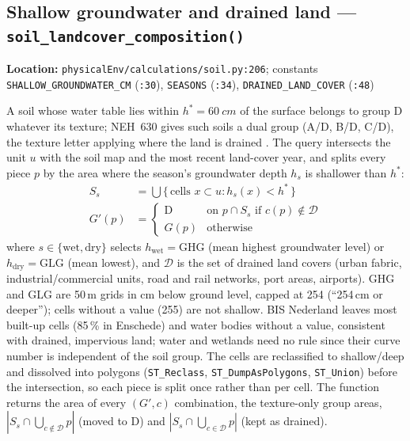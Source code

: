 \documentclass[11pt]{article}
\newcommand{\code}[1]{\texttt{#1}}
\begin{document}
\subsection{Shallow groundwater and drained land --- \code{soil\_landcover\_composition()}}
\label{sec:soil-composition}
\textbf{Location:} \code{physicalEnv/calculations/soil.py:206}; constants \code{SHALLOW\_GROUNDWATER\_CM} (\code{:30}), \code{SEASONS} (\code{:34}), \code{DRAINED\_LAND\_COVER} (\code{:48})

A soil whose water table lies within $h^\ast = \SI{60}{cm}$ of the surface belongs to group D whatever its texture; NEH~630 gives such soils a dual group (A/D, B/D, C/D), the texture letter applying where the land is drained \cite{NEH630ch7}. The query intersects the unit $u$ with the soil map and the most recent land-cover year, and splits every piece $p$ by the area where the season's groundwater depth $h_s$ is shallower than $h^\ast$:
\begin{align}
  S_s &= \bigcup \{\, \text{cells } x \subset u : h_s(x) < h^\ast \,\} \\
  G'(p) &= \begin{cases}
      \mathrm{D} & \text{on } p \cap S_s \text{ if } c(p) \notin \mathcal{D} \\
      G(p) & \text{otherwise}
  \end{cases}
\end{align}
where $s \in \{\text{wet}, \text{dry}\}$ selects $h_\text{wet} = \text{GHG}$ (mean highest groundwater level) or $h_\text{dry} = \text{GLG}$ (mean lowest), and $\mathcal{D}$ is the set of drained land covers (urban fabric, industrial/commercial units, road and rail networks, port areas, airports). GHG and GLG are 50\,m grids in \si{cm} below ground level, capped at 254 (``254\,cm or deeper''); cells without a value (255) are not shallow. BIS Nederland leaves most built-up cells (85\,\% in Enschede) and water bodies without a value, consistent with drained, impervious land; water and wetlands need no rule since their curve number is independent of the soil group. The cells are reclassified to shallow/deep and dissolved into polygons (\code{ST\_Reclass}, \code{ST\_DumpAsPolygons}, \code{ST\_Union}) before the intersection, so each piece is split once rather than per cell. The function returns the area of every $(G', c)$ combination, the texture-only group areas, $|S_s \cap \bigcup_{c \notin \mathcal{D}} p|$ (moved to D) and $|S_s \cap \bigcup_{c \in \mathcal{D}} p|$ (kept as drained).
\end{document}
